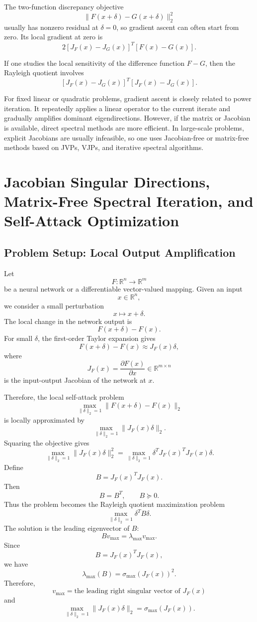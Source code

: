 \documentclass{article}
\begin{document}
The two-function discrepancy objective
\[
\|F(x+\delta)-G(x+\delta)\|_2^2
\]
usually has nonzero residual at \(\delta=0\), so gradient ascent can often start from zero. Its local gradient at zero is
\[
2
\left[
J_F(x)-J_G(x)
\right]^T
\left[
F(x)-G(x)
\right].
\]

If one studies the local sensitivity of the difference function \(F-G\), then the Rayleigh quotient involves
\[
\left[
J_F(x)-J_G(x)
\right]^T
\left[
J_F(x)-J_G(x)
\right].
\]

For fixed linear or quadratic problems, gradient ascent is closely related to power iteration. It repeatedly applies a linear operator to the current iterate and gradually amplifies dominant eigendirections. However, if the matrix or Jacobian is available, direct spectral methods are more efficient. In large-scale problems, explicit Jacobians are usually infeasible, so one uses Jacobian-free or matrix-free methods based on JVPs, VJPs, and iterative spectral algorithms.

\section{Jacobian Singular Directions, Matrix-Free Spectral Iteration, and Self-Attack Optimization}

\subsection{Problem Setup: Local Output Amplification}

Let
\[
F:\mathbb{R}^n\to \mathbb{R}^m
\]
be a neural network or a differentiable vector-valued mapping. Given an input
\[
x\in\mathbb{R}^n,
\]
we consider a small perturbation
\[
x\mapsto x+\delta.
\]
The local change in the network output is
\[
F(x+\delta)-F(x).
\]
For small \(\delta\), the first-order Taylor expansion gives
\[
F(x+\delta)-F(x)
\approx
J_F(x)\delta,
\]
where
\[
J_F(x)=\frac{\partial F(x)}{\partial x}\in\mathbb{R}^{m\times n}
\]
is the input-output Jacobian of the network at \(x\).

Therefore, the local self-attack problem
\[
\max_{\|\delta\|_2=1}
\|F(x+\delta)-F(x)\|_2
\]
is locally approximated by
\[
\max_{\|\delta\|_2=1}
\|J_F(x)\delta\|_2.
\]
Squaring the objective gives
\[
\max_{\|\delta\|_2=1}
\|J_F(x)\delta\|_2^2
=
\max_{\|\delta\|_2=1}
\delta^T J_F(x)^T J_F(x)\delta.
\]
Define
\[
B=J_F(x)^TJ_F(x).
\]
Then
\[
B=B^T,\qquad B\succeq 0.
\]
Thus the problem becomes the Rayleigh quotient maximization problem
\[
\max_{\|\delta\|_2=1}
\delta^T B\delta.
\]
The solution is the leading eigenvector of \(B\):
\[
Bv_{\max}=\lambda_{\max}v_{\max}.
\]
Since
\[
B=J_F(x)^TJ_F(x),
\]
we have
\[
\lambda_{\max}(B)=\sigma_{\max}(J_F(x))^2.
\]
Therefore,
\[
\boxed{
v_{\max}
=
\text{the leading right singular vector of }J_F(x)
}
\]
and
\[
\boxed{
\max_{\|\delta\|_2=1}\|J_F(x)\delta\|_2
=
\sigma_{\max}(J_F(x)).
}
\]
\end{document}
